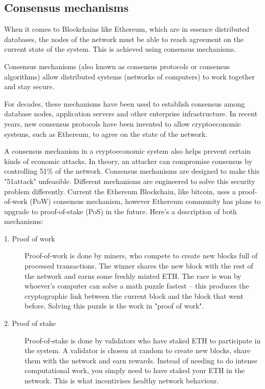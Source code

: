 \subsection{Consensus mechanisms}
When it comes to Blockchains like Ethereum, which are in essence distributed databases, the nodes of the network must be able to reach agreement on the current state of the system. This is achieved using consensus mechanisms.

Consensus mechanisms (also known as consensus protocols or consensus algorithms) allow distributed systems (networks of computers) to work together and stay secure.

For decades, these mechanisms have been used to establish consensus among database nodes, application servers and other enterprise infrastructure. In recent years, new consensus protocols have been invented to allow \gls{cryptoeconomic} systems, such as Ethereum, to agree on the state of the network.

A consensus mechanism in a cryptoeconomic system also helps prevent certain kinds of economic attacks. In theory, an attacker can compromise consensus by controlling 51\% of the network. Consensus mechanisms are designed to make this "\gls{51attack}" unfeasible. Different mechanisms are engineered to solve this security problem differently. Current the Ethereum Blockchain, like bitcoin, uses a proof-of-work (PoW) consensus mechanism, however Ethereum community has plans to upgrade to proof-of-stake (PoS) in the future\cite{ethereumcommunityEthereumDevelopmentDocumentation}. Here's a description of both mechanisms:

\begin{description}
\item[1. Proof of work] Proof-of-work is done by miners, who compete to create new blocks full of processed transactions. The winner shares the new block with the rest of the network and earns some freshly minted \gls{ETH}. The race is won by whoever's computer can solve a math puzzle fastest – this produces the cryptographic link between the current block and the block that went before. Solving this puzzle is the work in "proof of work".
\item[2. Proof of stake] Proof-of-stake is done by validators who have staked ETH to participate in the system. A validator is chosen at random to create new blocks, share them with the network and earn rewards. Instead of needing to do intense computational work, you simply need to have staked your ETH in the network. This is what incentivises healthy network behaviour.
\end{description}

